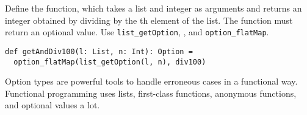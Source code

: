 Define the  function, which takes a list and integer 
as arguments and returns an integer obtained by dividing  by the
th element of the list. The function must return an optional value. Use
\verb!list_getOption!, , and \verb!option_flatMap!.

\begin{verbatim}
def getAndDiv100(l: List, n: Int): Option =
  option_flatMap(list_getOption(l, n), div100)
\end{verbatim}

Option types are powerful tools to handle erroneous cases in a functional way.
Functional programming uses lists, first-class functions, anonymous functions,
and optional values a lot.
